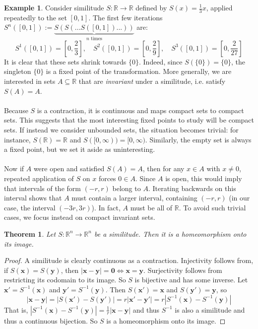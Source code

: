 \documentclass{article}
\theoremstyle{plain}
\newtheorem{thm}{Theorem}[section]
\theoremstyle{definition}
\newtheorem*{ex}{Example}
\theoremstyle{remark}
\begin{document}
\begin{ex}
    Consider similitude $S: \mathbb{R} \to \mathbb{R}$ defined by $S(x) = \frac{1}{3}x$, applied repeatedly to the set $[0,1]$. The first few iterations $S^n([0,1]) := \underbrace{S(S(...S([0,1])...))}_{n \text{ times}}$ are:
\[
        S^1([0,1])  = \left [0, \frac{2}{3} \right ], \quad
    S^2([0,1])  = \left [0, \frac{2}{9} \right ], \quad
        S^3([0,1])  = \left [0, \frac{2}{27} \right ]
  \]
    It is clear that these sets shrink towards $\{0\}$. Indeed, since $S(\{0\}) = \{0\}$, the singleton $\{0\}$ is a fixed point of the transformation. More generally, we are interested in sets $A \subseteq \mathbb{R}$ that are \textit{invariant} under a similitude, i.e. satisfy $S(A) = A$.
~\\~\\ Because $S$ is a contraction, it is continuous and maps compact sets to compact sets. This suggests that the most interesting fixed points to study will be compact sets. If instead we consider unbounded sets, the situation becomes trivial: for instance, $S(\mathbb{R}) = \mathbb{R}$ and $S([0, \infty )) = [0, \infty)$. Similarly, the empty set is always a fixed point, but we set it aside as uninteresting. \\ ~\\ Now if $A$ were open and satisfied $S(A) = A$, then for any $x\in A$ with $x \ne 0$, repeated application of $S$ on $x$ forces $0 \in A$. Since $A$ is open, this would imply that intervals of the form $(-r,r)$ belong to $A$. Iterating backwards on this interval shows that $A$ must contain a larger interval, containing $(-r, r)$ (in our case, the interval $(-3r,3r)$). In fact, $A$ must be all of $\mathbb{R}$. To avoid such trivial cases, we focus instead on compact invariant sets.

\end{ex}

\begin{thm}\label{thm:homeo}
Let $S : \mathbb{R}^n \to \mathbb{R}^n$ be a similitude. Then it is a homeomorphism onto its image.
\end{thm}

\begin{proof}
A similitude is clearly continuous as a contraction. Injectivity follows from, if $S(\mathbf{x}) = S(\mathbf{y})$, then $|\mathbf{x}-\mathbf{y}| = \mathbf{0} \iff \mathbf{x}=\mathbf{y}$. Surjectivity follows from restricting its codomain to its image. So $S$ is bijective and has some inverse. Let $\mathbf{x'} = S^{-1} (\mathbf{x})$ and $\mathbf{y'} = S^{-1}(\mathbf{y})$. Then $S(\mathbf{x'}) = \mathbf{x}$ and $S(\mathbf{y'}) = \mathbf{y}$, so \[
|\mathbf{x}-\mathbf{y}| = |S(\mathbf{x'}) - S(\mathbf{y'})| = r|\mathbf{x'} - \mathbf{y'}| = r|S^{-1}(\mathbf{x}) - S^{-1}(\mathbf{y})|
\]
That is, $|S^{-1}(\mathbf{x}) - S^{-1}(\mathbf{y})| = \frac{1}{r} |\mathbf{x}-\mathbf{y}|$ and thus $S^{-1}$ is also a similitude and thus a continuous bijection. So $S$ is a homeomorphism onto its image.
\end{proof}
\end{document}
